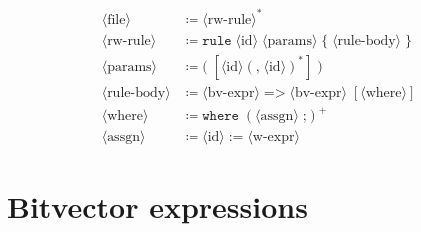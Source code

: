 \documentclass[letterpaper]{article}
\begin{document}
\begin{align*}
\langle\text{file}\rangle
  &\coloneqq \langle\text{rw-rule}\rangle^* \\
\langle\text{rw-rule}\rangle
  &\coloneqq \texttt{rule}\;\langle\text{id}\rangle\;\langle\text{params}\rangle\;
     \texttt{\{}\;\langle\text{rule-body}\rangle\;\texttt{\}} \\
\langle\text{params}\rangle
  &\coloneqq \texttt{(}\;[\langle\text{id}\rangle
     (\texttt{,}\;\langle\text{id}\rangle)^*]\;\texttt{)} \\
\langle\text{rule-body}\rangle
  &\coloneqq \langle\text{bv-expr}\rangle\;\texttt{=>}\;\langle\text{bv-expr}\rangle
     \;[\langle\text{where}\rangle] \\
\langle\text{where}\rangle
  &\coloneqq \texttt{where}\;(\langle\text{assgn}\rangle\;\texttt{;})^+ \\
\langle\text{assgn}\rangle
  &\coloneqq \langle\text{id}\rangle\;\texttt{:=}\;\langle\text{w-expr}\rangle
\end{align*}

\section*{Bitvector expressions}
\end{document}
